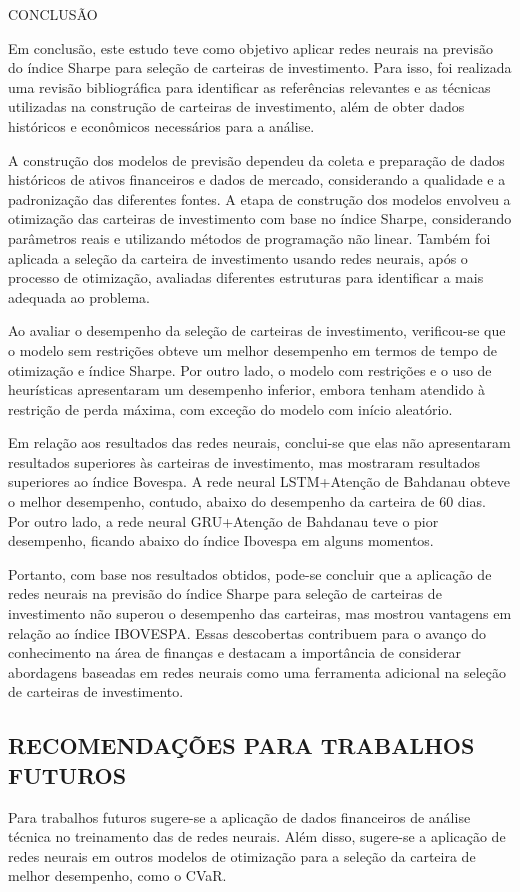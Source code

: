 \begin{section}{CONCLUSÃO}
    
        \ipar Em conclusão, este estudo teve como objetivo aplicar redes neurais na previsão do índice Sharpe para seleção de carteiras de investimento. Para isso, foi realizada uma revisão bibliográfica para identificar as referências relevantes e as técnicas utilizadas na construção de carteiras de investimento, além de obter dados históricos e econômicos necessários para a análise.

        \ipar A construção dos modelos de previsão dependeu da coleta e preparação de dados históricos de ativos financeiros e dados de mercado, considerando a qualidade e a padronização das diferentes fontes. A etapa de construção dos modelos envolveu a otimização das carteiras de investimento com base no índice Sharpe, considerando parâmetros reais e utilizando métodos de programação não linear. Também foi aplicada a seleção da carteira de investimento usando redes neurais, após o processo de otimização, avaliadas diferentes estruturas para identificar a mais adequada ao problema.

        \ipar Ao avaliar o desempenho da seleção de carteiras de investimento, verificou-se que o modelo sem restrições obteve um melhor desempenho em termos de tempo de otimização e índice Sharpe. Por outro lado, o modelo com restrições e o uso de heurísticas apresentaram um desempenho inferior, embora tenham atendido à restrição de perda máxima, com exceção do modelo com início aleatório.

        \ipar Em relação aos resultados das redes neurais, conclui-se que elas não apresentaram resultados superiores às carteiras de investimento, mas mostraram resultados superiores ao índice Bovespa. A rede neural \acrshort{LSTM}+Atenção de Bahdanau obteve o melhor desempenho, contudo, abaixo do desempenho da carteira de 60 dias. Por outro lado, a rede neural GRU+Atenção de Bahdanau teve o pior desempenho, ficando abaixo do índice Ibovespa em alguns momentos.

        \ipar Portanto, com base nos resultados obtidos, pode-se concluir que a aplicação de redes neurais na previsão do índice Sharpe para seleção de carteiras de investimento não superou o desempenho das carteiras, mas mostrou vantagens em relação ao índice \acrshort{IBOVESPA}. Essas descobertas contribuem para o avanço do conhecimento na área de finanças e destacam a importância de considerar abordagens baseadas em redes neurais como uma ferramenta adicional na seleção de carteiras de investimento.

        \subsection{RECOMENDAÇÕES PARA TRABALHOS FUTUROS}

                \ipar Para trabalhos futuros sugere-se a aplicação de dados financeiros de análise técnica no treinamento das de redes neurais. Além disso, sugere-se a aplicação de redes neurais em outros modelos de otimização para a seleção da carteira de melhor desempenho, como o \acrshort{CVaR}.

\end{section}

\pagebreak